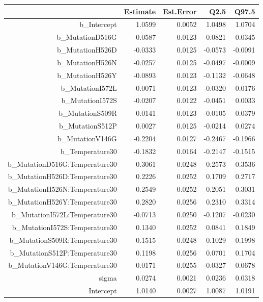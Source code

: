 \begin{table}[ht]
\centering
\begin{tabular}{rrrrr}
  \hline
 & Estimate & Est.Error & Q2.5 & Q97.5 \\ 
  \hline
b\_Intercept & 1.0599 & 0.0052 & 1.0498 & 1.0704 \\ 
  b\_MutationD516G & -0.0587 & 0.0123 & -0.0821 & -0.0345 \\ 
  b\_MutationH526D & -0.0333 & 0.0125 & -0.0573 & -0.0091 \\ 
  b\_MutationH526N & -0.0257 & 0.0125 & -0.0497 & -0.0009 \\ 
  b\_MutationH526Y & -0.0893 & 0.0123 & -0.1132 & -0.0648 \\ 
  b\_MutationI572L & -0.0071 & 0.0123 & -0.0320 & 0.0176 \\ 
  b\_MutationI572S & -0.0207 & 0.0122 & -0.0451 & 0.0033 \\ 
  b\_MutationS509R & 0.0141 & 0.0123 & -0.0105 & 0.0379 \\ 
  b\_MutationS512P & 0.0027 & 0.0125 & -0.0214 & 0.0274 \\ 
  b\_MutationV146G & -0.2204 & 0.0127 & -0.2467 & -0.1966 \\ 
  b\_Temperature30 & -0.1832 & 0.0164 & -0.2147 & -0.1515 \\ 
  b\_MutationD516G:Temperature30 & 0.3061 & 0.0248 & 0.2573 & 0.3536 \\ 
  b\_MutationH526D:Temperature30 & 0.2226 & 0.0252 & 0.1709 & 0.2717 \\ 
  b\_MutationH526N:Temperature30 & 0.2549 & 0.0252 & 0.2051 & 0.3031 \\ 
  b\_MutationH526Y:Temperature30 & 0.2820 & 0.0256 & 0.2310 & 0.3314 \\ 
  b\_MutationI572L:Temperature30 & -0.0713 & 0.0250 & -0.1207 & -0.0230 \\ 
  b\_MutationI572S:Temperature30 & 0.1340 & 0.0252 & 0.0841 & 0.1849 \\ 
  b\_MutationS509R:Temperature30 & 0.1515 & 0.0248 & 0.1029 & 0.1998 \\ 
  b\_MutationS512P:Temperature30 & 0.1198 & 0.0256 & 0.0701 & 0.1704 \\ 
  b\_MutationV146G:Temperature30 & 0.0171 & 0.0255 & -0.0327 & 0.0678 \\ 
  sigma & 0.0274 & 0.0021 & 0.0236 & 0.0318 \\ 
  Intercept & 1.0140 & 0.0027 & 1.0087 & 1.0191 \\ 

\end{tabular}
\end{table}
